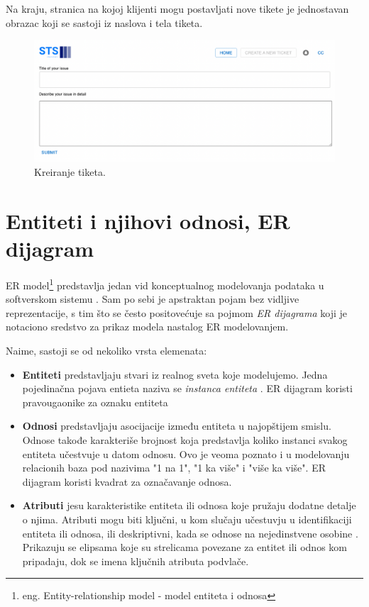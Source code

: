 \documentclass[12pt,oneside]{memoir}
\begin{document}
Na kraju, stranica na kojoj klijenti mogu postavljati nove tikete je jednostavan obrazac koji se sastoji iz naslova i tela tiketa.

\begin{figure}[h]
  \centering
  \includegraphics[width=1\textwidth]{docs/images/ch_1/ticket-new.png} 
  \caption{Kreiranje tiketa.}
\end{figure}

\newpage
\section{Entiteti i njihovi odnosi, ER dijagram}

ER model\footnote{eng. Entity-relationship model - model entiteta i odnosa} predstavlja jedan vid konceptualnog modelovanja podataka u softverskom sistemu \cite{dbmodelinganddesign}. Sam po sebi je apstraktan pojam bez vidljive reprezentacije, s tim što se često positovećuje sa pojmom \textit{ER dijagrama} koji je notaciono sredstvo za prikaz modela nastalog ER modelovanjem.

Naime, sastoji se od nekoliko vrsta elemenata:
\begin{itemize}
    \item \textbf{Entiteti} predstavljaju stvari iz realnog sveta koje modelujemo. Jedna pojedinačna pojava entieta naziva se \textit{instanca entiteta} \cite{dbmodelinganddesign}. ER dijagram koristi pravougaonike za oznaku entiteta
    \item \textbf{Odnosi} predstavljaju asocijacije između entiteta u najopštijem smislu. Odnose takođe karakteriše brojnost koja predstavlja koliko instanci svakog entiteta učestvuje u datom odnosu. Ovo je veoma poznato i u modelovanju relacionih baza pod nazivima "1 na 1", "1 ka više" i "više ka više". ER dijagram koristi kvadrat za označavanje odnosa.
    \item \textbf{Atributi} jesu karakteristike entiteta ili odnosa koje pružaju dodatne detalje o njima. Atributi mogu biti ključni, u kom slučaju učestuvju u identifikaciji entiteta ili odnosa, ili deskriptivni, kada se odnose na nejedinstvene osobine \cite{dbmodelinganddesign}. Prikazuju se elipsama koje su strelicama povezane za entitet ili odnos kom pripadaju, dok se imena ključnih atributa podvlače.
\end{itemize}
\end{document}
